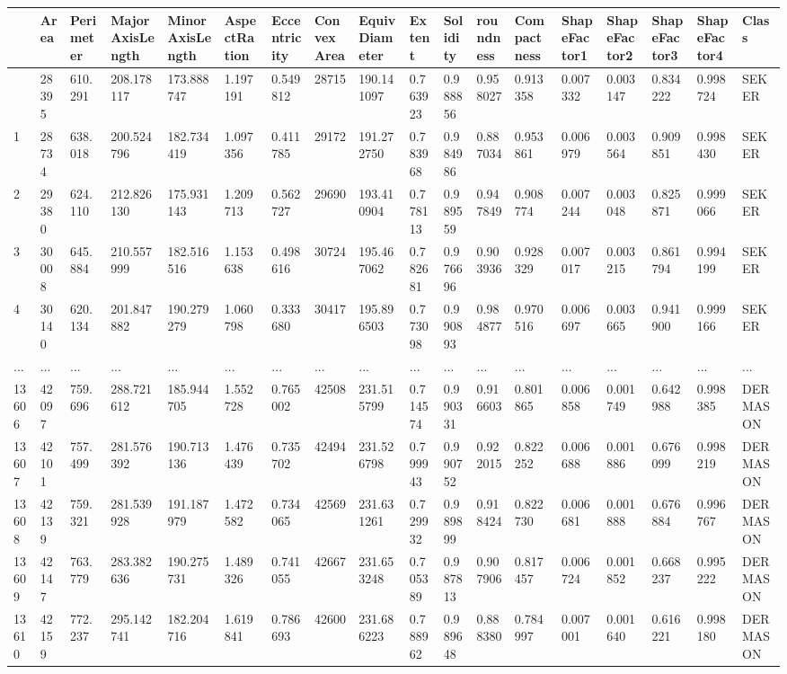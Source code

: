 \documentclass[
  letterpaper,
]{krantz}
\begin{document}
\begin{longtable}[]{@{}llllllllllllllllll@{}}
\toprule\noalign{}
& Area & Perimeter & MajorAxisLength & MinorAxisLength & AspectRation &
Eccentricity & ConvexArea & EquivDiameter & Extent & Solidity &
roundness & Compactness & ShapeFactor1 & ShapeFactor2 & ShapeFactor3 &
ShapeFactor4 & Class \\
\midrule\noalign{}
\endhead
\bottomrule\noalign{}
\endlastfoot
0 & 28395 & 610.291 & 208.178117 & 173.888747 & 1.197191 & 0.549812 &
28715 & 190.141097 & 0.763923 & 0.988856 & 0.958027 & 0.913358 &
0.007332 & 0.003147 & 0.834222 & 0.998724 & SEKER \\
1 & 28734 & 638.018 & 200.524796 & 182.734419 & 1.097356 & 0.411785 &
29172 & 191.272750 & 0.783968 & 0.984986 & 0.887034 & 0.953861 &
0.006979 & 0.003564 & 0.909851 & 0.998430 & SEKER \\
2 & 29380 & 624.110 & 212.826130 & 175.931143 & 1.209713 & 0.562727 &
29690 & 193.410904 & 0.778113 & 0.989559 & 0.947849 & 0.908774 &
0.007244 & 0.003048 & 0.825871 & 0.999066 & SEKER \\
3 & 30008 & 645.884 & 210.557999 & 182.516516 & 1.153638 & 0.498616 &
30724 & 195.467062 & 0.782681 & 0.976696 & 0.903936 & 0.928329 &
0.007017 & 0.003215 & 0.861794 & 0.994199 & SEKER \\
4 & 30140 & 620.134 & 201.847882 & 190.279279 & 1.060798 & 0.333680 &
30417 & 195.896503 & 0.773098 & 0.990893 & 0.984877 & 0.970516 &
0.006697 & 0.003665 & 0.941900 & 0.999166 & SEKER \\
... & ... & ... & ... & ... & ... & ... & ... & ... & ... & ... & ... &
... & ... & ... & ... & ... & ... \\
13606 & 42097 & 759.696 & 288.721612 & 185.944705 & 1.552728 & 0.765002
& 42508 & 231.515799 & 0.714574 & 0.990331 & 0.916603 & 0.801865 &
0.006858 & 0.001749 & 0.642988 & 0.998385 & DERMASON \\
13607 & 42101 & 757.499 & 281.576392 & 190.713136 & 1.476439 & 0.735702
& 42494 & 231.526798 & 0.799943 & 0.990752 & 0.922015 & 0.822252 &
0.006688 & 0.001886 & 0.676099 & 0.998219 & DERMASON \\
13608 & 42139 & 759.321 & 281.539928 & 191.187979 & 1.472582 & 0.734065
& 42569 & 231.631261 & 0.729932 & 0.989899 & 0.918424 & 0.822730 &
0.006681 & 0.001888 & 0.676884 & 0.996767 & DERMASON \\
13609 & 42147 & 763.779 & 283.382636 & 190.275731 & 1.489326 & 0.741055
& 42667 & 231.653248 & 0.705389 & 0.987813 & 0.907906 & 0.817457 &
0.006724 & 0.001852 & 0.668237 & 0.995222 & DERMASON \\
13610 & 42159 & 772.237 & 295.142741 & 182.204716 & 1.619841 & 0.786693
& 42600 & 231.686223 & 0.788962 & 0.989648 & 0.888380 & 0.784997 &
0.007001 & 0.001640 & 0.616221 & 0.998180 & DERMASON \\
\end{longtable}
\end{document}
